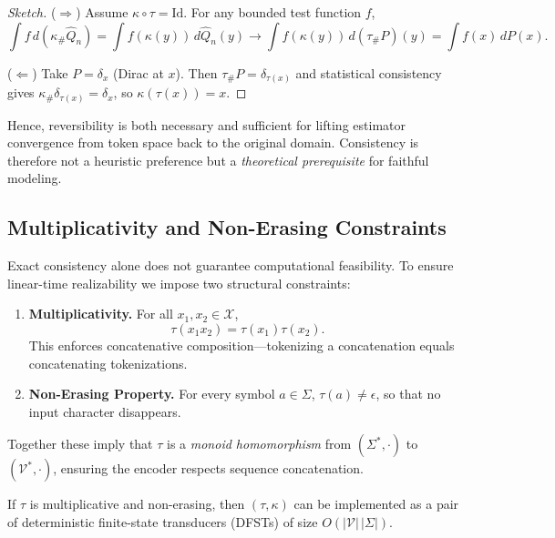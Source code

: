 \begin{proof}[Sketch]
($\Rightarrow$)  
Assume $\kappa\!\circ\!\tau = \mathrm{Id}$.  
For any bounded test function $f$,
\[
\int f\,d(\kappa_{\#}\hat Q_n)
=\int f(\kappa(y))\,d\hat Q_n(y)
\to \int f(\kappa(y))\,d(\tau_{\#}P)(y)
= \int f(x)\,dP(x).
\]

($\Leftarrow$)  
Take $P=\delta_x$ (Dirac at $x$).
Then $\tau_{\#}P=\delta_{\tau(x)}$ and
statistical consistency gives
$\kappa_{\#}\delta_{\tau(x)}=\delta_x$,
so $\kappa(\tau(x))=x$.
\end{proof}

Hence, reversibility is both necessary and sufficient
for lifting estimator convergence from token space
back to the original domain.
Consistency is therefore not a heuristic preference
but a \emph{theoretical prerequisite} for faithful modeling.

\subsection{Multiplicativity and Non-Erasing Constraints}

Exact consistency alone does not guarantee computational feasibility.
To ensure linear-time realizability we impose two structural constraints:

\begin{enumerate}
\item \textbf{Multiplicativity.}
For all $x_1,x_2\in\mathcal{X}$,
\[
\tau(x_1x_2)=\tau(x_1)\tau(x_2).
\]
This enforces concatenative composition—tokenizing a
concatenation equals concatenating tokenizations.

\item \textbf{Non-Erasing Property.}
For every symbol $a\in\Sigma$, $\tau(a)\neq\epsilon$,
so that no input character disappears.
\end{enumerate}

Together these imply that $\tau$
is a \emph{monoid homomorphism} from
$(\Sigma^{*},\cdot)$ to $(\mathcal{V}^{*},\cdot)$,
ensuring the encoder respects sequence concatenation.

\begin{proposition}
If $\tau$ is multiplicative and non-erasing,
then $(\tau,\kappa)$ can be implemented as
a pair of deterministic finite-state transducers (DFSTs)
of size $O(|\mathcal{V}|\,|\Sigma|)$.
\end{proposition}

